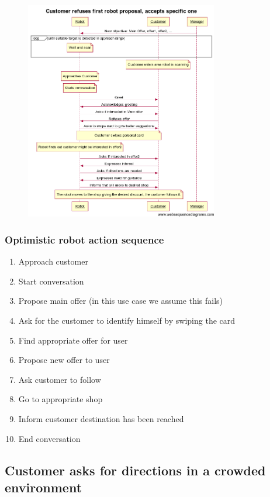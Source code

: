 \begin{figure}[!h]

\includegraphics[width=0.75\textwidth]{offerReasoning}

\end{figure}



\subsubsection{Optimistic robot action sequence}
\begin{enumerate}
\item Approach customer
\item Start conversation
\item Propose main offer (in this use case we assume this fails)
\item Ask for the customer to identify himself by swiping the card
\item Find appropriate offer for user
\item Propose new offer to user
\item Ask customer to follow
\item Go to appropriate shop
\item Inform customer destination has been reached
\item End conversation
\end{enumerate}


\subsection{Customer asks for directions in a crowded environment}

